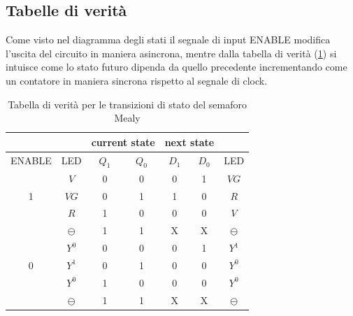 \documentclass[10pt, a4paper, italian]{article}
\begin{document}
\subsection{Tabelle di verità}
Come visto nel diagramma degli stati il segnale di input ENABLE modifica
l'uscita del circuito in maniera asincrona, mentre dalla tabella di verità
(\cref{tab: semftruth}) si intuisce come lo stato futuro dipenda da quello
precedente incrementando come un contatore in maniera sincrona rispetto al
segnale di clock.
\begin{table}[htbp]
    \centering
    \begin{tabular}{c|c|cc|cc|c}
    &\multicolumn{1}{c}{ }&\multicolumn{2}{c|}{current state} &\multicolumn{2}{c}{next state}\\
     \hline
         ENABLE& LED & $Q_1$ & $Q_0$ & $D_1$ & $D_0$ & LED \\
         \hline
       & $V$ & 0 & 0 & 0 & 1 & $VG$ \\
       1 & $VG$ & 0 & 1 & 1 & 0 & $R$ \\
       & $R$ & 1 & 0 & 0 & 0 & $V$ \\
        & $\ominus$ & 1 & 1 & X & X & $\ominus$\\
        \hline
        & $Y^0$ & 0 & 0 & 0 & 1 & $Y^1$ \\
        0 & $Y^1$ & 0 & 1 & 0 & 0 & $Y^0$ \\
         & $Y^0$ & 1 & 0 & 0 & 0& $Y^0$ \\
         &  $\ominus$ & 1 & 1 & X & X & $\ominus$ \\
    \end{tabular}
    \caption{Tabella di verità per le transizioni di stato del semaforo Mealy}
    \label{tab: semftruth}
\end{table}
\end{document}
